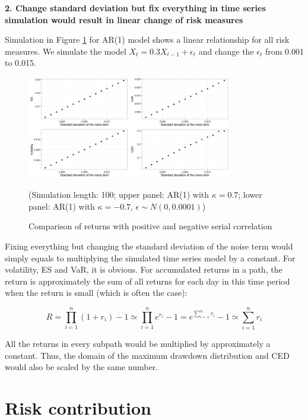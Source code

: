 \documentclass[11pt]{article}
\begin{document}
\textbf{2. Change standard deviation but fix everything in time series simulation would result in linear change of risk measures}

Simulation in Figure \ref{fig:change_std_simulation} for AR(1) model shows a linear relationship for all risk measures. We simulate the model $X_t = 0.3X_{t-1} + \epsilon_t$ and change the $\epsilon_t$ from 0.001 to 0.015.

\begin{figure}[H]
\centering
\includegraphics[width = 0.8\textwidth]{../figures/simulation/AR1_risk_measures_change_sd}
\caption{Comparison of returns with positive and negative serial correlation}
(Simulation length: 100; upper panel: AR(1) with $\kappa=0.7$; lower panel: AR(1) with $\kappa=-0.7$, $\epsilon\sim N(0, 0.0001)$)
\label{fig:change_std_simulation}
\end{figure}

Fixing everything but changing the standard deviation of the noise term would simply equals to multiplying the simulated time series model by a constant. For volatility, ES and VaR, it is obvious. For accumulated returns in a path, the return is approximately the sum of all returns for each day in this time period when the return is small (which is often the case):

\begin{equation}
R = \prod_{i=1}^n (1+r_i) - 1 \simeq \prod_{i=1}^n e^{r_i} - 1 = e^{\sum_{i=1}^n r_i} - 1 
 \simeq  \sum_{i=1}^n r_i
\end{equation}

All the returns in every subpath would be multiplied by approximately a constant. Thus, the domain of the maximum drawdown distribution and CED would also be scaled by the same number.

\section{Risk contribution}
\end{document}
